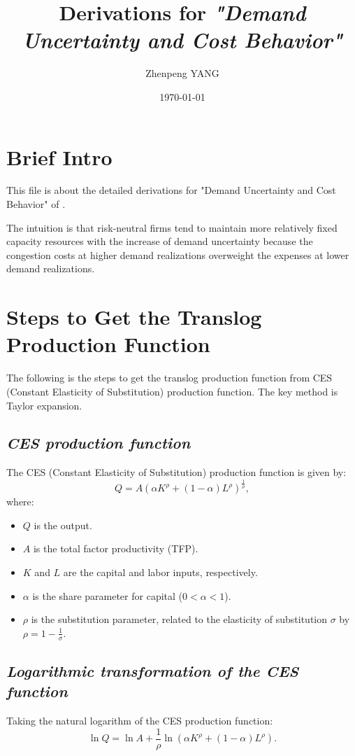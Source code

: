 \documentclass{article}
\title{Derivations for \textit{"Demand Uncertainty and Cost Behavior"}}
\author{Zhenpeng YANG}
\date{\today}
\begin{document}
\maketitle
\section*{Brief Intro}
This file is about the detailed derivations for "Demand Uncertainty and Cost Behavior" of \cite{banker2014demand}.\par
The intuition is that risk-neutral firms tend to maintain more relatively fixed capacity resources with the increase of demand uncertainty because the congestion costs at higher demand realizations overweight the expenses at lower demand realizations.

\section*{Steps to Get the Translog Production Function}
The following is the steps to get the translog production function from CES (Constant Elasticity of Substitution) production function. The key method is Taylor expansion.
\subsection*{\textit{CES production function}}
The CES (Constant Elasticity of Substitution) production function is given by:
\[
Q = A \left( \alpha K^\rho + (1 - \alpha) L^\rho \right)^{\frac{1}{\rho}},
\]
where:
\begin{itemize}
    \item \( Q \) is the output.
    \item \( A \) is the total factor productivity (TFP).
    \item \( K \) and \( L \) are the capital and labor inputs, respectively.
    \item \( \alpha \) is the share parameter for capital (\( 0 < \alpha < 1 \)).
    \item \( \rho \) is the substitution parameter, related to the elasticity of substitution \( \sigma \) by \( \rho = 1 - \frac{1}{\sigma} \).
\end{itemize}

\subsection*{\textit{Logarithmic transformation of the CES function}}
Taking the natural logarithm of the CES production function:
\[
\ln Q = \ln A + \frac{1}{\rho} \ln \left( \alpha K^\rho + (1 - \alpha) L^\rho \right).
\]
\end{document}
